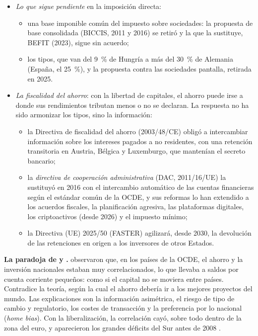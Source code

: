 \documentclass[11pt]{article}
\begin{document}
\begin{itemize}
\begin{itemize}
  \end{itemize}
\item \emph{Lo que sigue pendiente} en la imposición directa:
  \begin{itemize}
  \item una base imponible común del impuesto sobre sociedades: la propuesta de base consolidada (BICCIS, 2011 y 2016) se retiró y la que la sustituye, BEFIT (2023), sigue sin acuerdo;
  \item los tipos, que van del 9~\% de Hungría a más del 30~\% de Alemania (España, el 25~\%)\nocite{TaxFoundation2026Sociedades}, y la propuesta contra las sociedades pantalla, retirada en 2025.
  \end{itemize}
\item \emph{La fiscalidad del ahorro}: con la libertad de capitales, el ahorro puede irse a donde sus rendimientos tributan menos o no se declaran. La respuesta no ha sido armonizar los tipos, sino la información:
  \begin{itemize}
  \item la Directiva de fiscalidad del ahorro (2003/48/CE) obligó a intercambiar información sobre los intereses pagados a no residentes, con una retención transitoria en Austria, Bélgica y Luxemburgo, que mantenían el secreto bancario;
  \item la \emph{directiva de cooperación administrativa} (DAC, 2011/16/UE) la sustituyó en 2016 con el intercambio automático de las cuentas financieras según el estándar común de la OCDE, y sus reformas lo han extendido a los acuerdos fiscales, la planificación agresiva, las plataformas digitales, los criptoactivos (desde 2026) y el impuesto mínimo;
  \item la Directiva (UE) 2025/50 (FASTER) agilizará, desde 2030, la devolución de las retenciones en origen a los inversores de otros Estados.
  \end{itemize}
\end{itemize}

\begin{anotaciones}
\textbf{La paradoja de  y .} \textcite{FeldsteinHorioka1980Domestic} observaron que, en los países de la OCDE, el ahorro y la inversión nacionales estaban muy correlacionados, lo que llevaba a saldos por cuenta corriente pequeños: como si el capital no se moviera entre países. Contradice la teoría, según la cual el ahorro debería ir a los mejores proyectos del mundo. Las explicaciones son la información asimétrica, el riesgo de tipo de cambio y regulatorio, los costes de transacción y la preferencia por lo nacional (\emph{home bias}). Con la liberalización, la correlación cayó, sobre todo dentro de la zona del euro\nocite{BlanchardGiavazzi2002Current}, y aparecieron los grandes déficits del Sur antes de 2008 .
\end{anotaciones}
\end{document}
